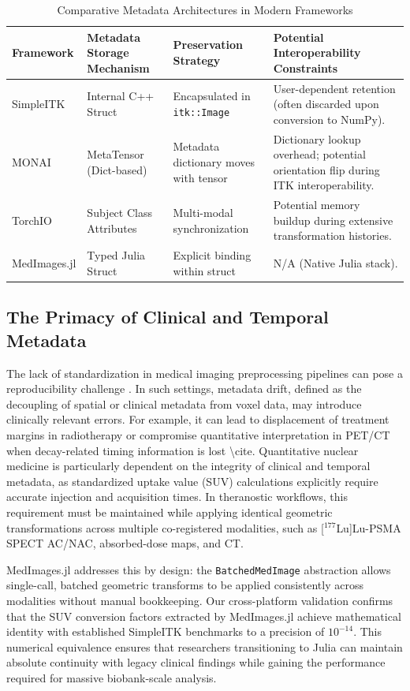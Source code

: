 \documentclass[10pt,letterpaper]{article}
\begin{document}
\begin{table}[H]
\centering
\caption{Comparative Metadata Architectures in Modern Frameworks}
\begin{tabular}{|p{2.5cm}|p{3.5cm}|p{3.5cm}|p{3.5cm}|}
\hline
\textbf{Framework} & \textbf{Metadata Storage Mechanism} & \textbf{Preservation Strategy} & \textbf{Potential Interoperability Constraints} \\
\hline
SimpleITK & Internal C++ Struct & Encapsulated in \texttt{itk::Image} & User-dependent retention (often discarded upon conversion to NumPy). \\
\hline
MONAI & MetaTensor (Dict-based) & Metadata dictionary moves with tensor & Dictionary lookup overhead; potential orientation flip during ITK interoperability. \\
\hline
TorchIO & Subject Class Attributes & Multi-modal synchronization & Potential memory buildup during extensive transformation histories. \\
\hline
MedImages.jl & Typed Julia Struct & Explicit binding within struct & N/A (Native Julia stack). \\
\hline
\end{tabular}
\label{tab:metadata_comparison}
\end{table}

\subsection*{The Primacy of Clinical and Temporal Metadata}
The lack of standardization in medical imaging preprocessing pipelines can pose a reproducibility challenge \cite{Esteban_2018}. In such settings, metadata drift, defined as the decoupling of spatial or clinical metadata from voxel data, may introduce clinically relevant errors. For example, it can lead to displacement of treatment margins in radiotherapy or compromise quantitative interpretation in PET/CT when decay-related timing information is lost \textbackslash{}cite. Quantitative nuclear medicine is particularly dependent on the integrity of clinical and temporal metadata, as standardized uptake value (SUV) calculations explicitly require accurate injection and acquisition times. In theranostic workflows, this requirement must be maintained while applying identical geometric transformations across multiple co-registered modalities, such as [$^{177}$Lu]Lu-PSMA SPECT AC/NAC, absorbed-dose maps, and CT.

MedImages.jl addresses this by design: the \texttt{BatchedMedImage} abstraction allows single-call, batched geometric transforms to be applied consistently across modalities without manual bookkeeping. Our cross-platform validation confirms that the SUV conversion factors extracted by MedImages.jl achieve mathematical identity with established SimpleITK benchmarks to a precision of $10^{-14}$. This numerical equivalence ensures that researchers transitioning to Julia can maintain absolute continuity with legacy clinical findings while gaining the performance required for massive biobank-scale analysis.
\end{document}
